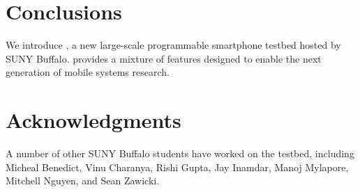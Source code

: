 \section{Conclusions}
\label{sec-conclusions}

We introduce \PhoneLab{}, a new large-scale programmable smartphone testbed
hosted by SUNY Buffalo. \PhoneLab{} provides a mixture of features designed
to enable the next generation of mobile systems research.

\section*{Acknowledgments}

A number of other SUNY Buffalo students have worked on the \PhoneLab{}
testbed, including Micheal Benedict, Vinu Charanya, Rishi Gupta, Jay Inamdar,
Manoj Mylapore, Mitchell Nguyen, and Sean Zawicki.

